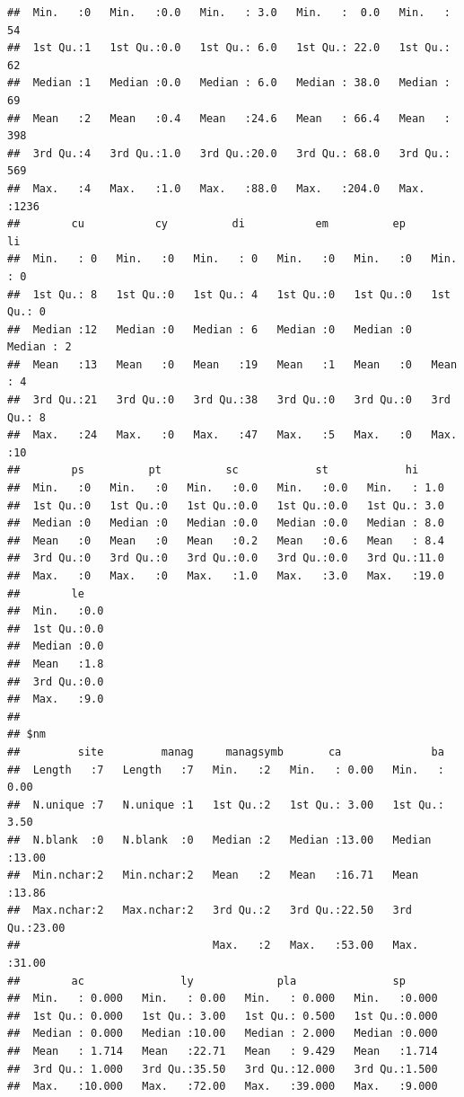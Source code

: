 \documentclass[
]{article}
\begin{document}
\begin{verbatim}
##  Min.   :0   Min.   :0.0   Min.   : 3.0   Min.   :  0.0   Min.   :  54  
##  1st Qu.:1   1st Qu.:0.0   1st Qu.: 6.0   1st Qu.: 22.0   1st Qu.:  62  
##  Median :1   Median :0.0   Median : 6.0   Median : 38.0   Median :  69  
##  Mean   :2   Mean   :0.4   Mean   :24.6   Mean   : 66.4   Mean   : 398  
##  3rd Qu.:4   3rd Qu.:1.0   3rd Qu.:20.0   3rd Qu.: 68.0   3rd Qu.: 569  
##  Max.   :4   Max.   :1.0   Max.   :88.0   Max.   :204.0   Max.   :1236  
##        cu           cy          di           em          ep          li    
##  Min.   : 0   Min.   :0   Min.   : 0   Min.   :0   Min.   :0   Min.   : 0  
##  1st Qu.: 8   1st Qu.:0   1st Qu.: 4   1st Qu.:0   1st Qu.:0   1st Qu.: 0  
##  Median :12   Median :0   Median : 6   Median :0   Median :0   Median : 2  
##  Mean   :13   Mean   :0   Mean   :19   Mean   :1   Mean   :0   Mean   : 4  
##  3rd Qu.:21   3rd Qu.:0   3rd Qu.:38   3rd Qu.:0   3rd Qu.:0   3rd Qu.: 8  
##  Max.   :24   Max.   :0   Max.   :47   Max.   :5   Max.   :0   Max.   :10  
##        ps          pt          sc            st            hi      
##  Min.   :0   Min.   :0   Min.   :0.0   Min.   :0.0   Min.   : 1.0  
##  1st Qu.:0   1st Qu.:0   1st Qu.:0.0   1st Qu.:0.0   1st Qu.: 3.0  
##  Median :0   Median :0   Median :0.0   Median :0.0   Median : 8.0  
##  Mean   :0   Mean   :0   Mean   :0.2   Mean   :0.6   Mean   : 8.4  
##  3rd Qu.:0   3rd Qu.:0   3rd Qu.:0.0   3rd Qu.:0.0   3rd Qu.:11.0  
##  Max.   :0   Max.   :0   Max.   :1.0   Max.   :3.0   Max.   :19.0  
##        le     
##  Min.   :0.0  
##  1st Qu.:0.0  
##  Median :0.0  
##  Mean   :1.8  
##  3rd Qu.:0.0  
##  Max.   :9.0  
## 
## $nm
##         site         manag     managsymb       ca              ba       
##  Length   :7   Length   :7   Min.   :2   Min.   : 0.00   Min.   : 0.00  
##  N.unique :7   N.unique :1   1st Qu.:2   1st Qu.: 3.00   1st Qu.: 3.50  
##  N.blank  :0   N.blank  :0   Median :2   Median :13.00   Median :13.00  
##  Min.nchar:2   Min.nchar:2   Mean   :2   Mean   :16.71   Mean   :13.86  
##  Max.nchar:2   Max.nchar:2   3rd Qu.:2   3rd Qu.:22.50   3rd Qu.:23.00  
##                              Max.   :2   Max.   :53.00   Max.   :31.00  
##        ac               ly             pla               sp       
##  Min.   : 0.000   Min.   : 0.00   Min.   : 0.000   Min.   :0.000  
##  1st Qu.: 0.000   1st Qu.: 3.00   1st Qu.: 0.500   1st Qu.:0.000  
##  Median : 0.000   Median :10.00   Median : 2.000   Median :0.000  
##  Mean   : 1.714   Mean   :22.71   Mean   : 9.429   Mean   :1.714  
##  3rd Qu.: 1.000   3rd Qu.:35.50   3rd Qu.:12.000   3rd Qu.:1.500  
##  Max.   :10.000   Max.   :72.00   Max.   :39.000   Max.   :9.000  

\end{verbatim}
\end{document}

